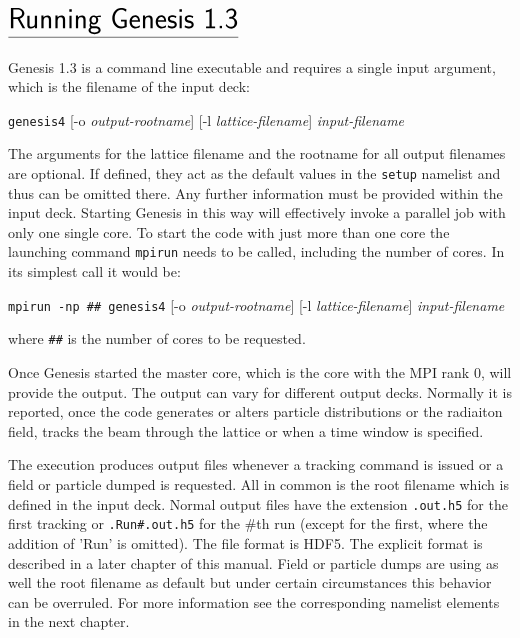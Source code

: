 \documentclass[12pt]{book}
\begin{document}
\chapter*{\vspace{-3cm}$\underline{\mbox{\rule[-0.5em]{0cm}{1em}\huge\sf Running Genesis 1.3}}$}
 

Genesis 1.3 is a command line executable and requires a single input argument, which is the filename of the input deck:

{\tt genesis4} [-o {\it output-rootname}] [-l {\it lattice-filename}] {\it input-filename}

The arguments for the lattice filename and the rootname for all output filenames are optional. If defined, they act as the default values in the {\tt setup} namelist and thus can be omitted there. Any further information must be provided within the input deck. Starting Genesis in this way will effectively invoke a parallel job with only one single core. To start the code with just more than one core the launching command {\tt mpirun} needs to be called, including the number of cores. In its simplest call it would be:

{\tt mpirun -np \#\# genesis4}  [-o {\it output-rootname}] [-l {\it lattice-filename}] {\it input-filename}

where {\tt \#\#} is the number of cores to be requested.  

Once Genesis started the master core, which is the core with the MPI rank 0, will provide the output. The output can vary for different output decks. Normally it is reported, once the code generates or alters particle distributions or the radiaiton field, tracks the beam through the lattice or when a time window is specified.

The execution produces output files whenever a tracking command is issued or a field or particle dumped is requested. All in common is the root filename which is defined in the input deck. Normal output files have the extension {\tt .out.h5} for the first tracking or {\tt .Run\#.out.h5} for the {\#}th run (except for the first, where the addition of 'Run' is omitted). The file format is HDF5. The explicit format is described in a later chapter of this manual.   Field or particle dumps are using as well the root filename as default but under certain circumstances this behavior can be overruled. For more information see the corresponding namelist elements in the next chapter.
\end{document}
